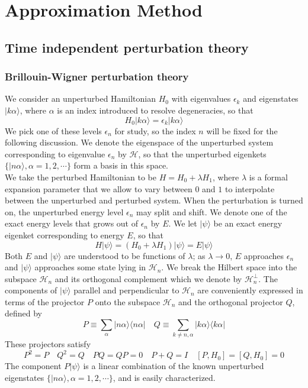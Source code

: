 \chapter{Approximation Method}
\section{Time independent perturbation theory}
\subsection{Brillouin-Wigner perturbation theory}
We consider an unperturbed Hamiltonian $H_0$ with eigenvalues $\epsilon_k$ and eigenstates $|k\alpha\rangle$, where $\alpha$ is an index introduced to resolve degeneracies, so that
\[H_0 |k\alpha\rangle = \epsilon_k |k\alpha\rangle\]
We pick one of these levels $\epsilon_n$ for study, so the index $n$ will be fixed for the following discussion. We denote the eigenspace of the unperturbed system corresponding to eigenvalue  $\epsilon_n$ by $\mathcal{H}$, so that the unperturbed eigenkets
$\{ |n\alpha\rangle, \alpha = 1,2,\cdots\}$ form a basis in this space.\\
We take the perturbed Hamiltonian to be $H = H_0 + \lambda H_1$, where $\lambda$ is a formal expansion parameter that we allow to vary between $0$ and $1$ to interpolate between the unperturbed and perturbed system. When the perturbation is turned on, the unperturbed energy level $\epsilon_n$ may split and shift. We denote one of the exact energy levels that grows out of $\epsilon_n$ by $E$. We let $|\psi\rangle$ be an exact energy eigenket corresponding to energy $E$, so that
\[H|\psi\rangle = (H_0 + \lambda H_1)|\psi\rangle = E|\psi\rangle\]
Both $E$ and $|\psi\rangle$ are understood to be functions of $\lambda$; as $\lambda \to 0$, $E$ approaches $\epsilon_n$ and $|\psi\rangle$ approaches some state lying in $\mathcal{H}_n$. We break the Hilbert space into the subspace $\mathcal{H}_n$ and its orthogonal complement which we denote by $\mathcal{H}_n^{\bot}$. The components of $|\psi\rangle$ parallel and perpendicular to $\mathcal{H}_n$ are conveniently expressed in terms of the projector $P$ onto the subspace $\mathcal{H}_n$ and the orthogonal projector $Q$, defined by
\[P \equiv \sum_{\alpha} |n\alpha\rangle \langle n\alpha| \quad Q \equiv \sum_{k \neq n,\alpha} |k\alpha\rangle \langle k\alpha|\]
These projectors satisfy
\[P^2=P \quad Q^2=Q \quad PQ=QP=0 \quad P+Q=I \quad [P,H_0]=[Q,H_0]=0\]
The component $P|\psi\rangle$ is a linear combination of the known unperturbed eigenstates $\{ |n\alpha\rangle, \alpha = 1,2,\cdots\}$, and is easily characterized. 

